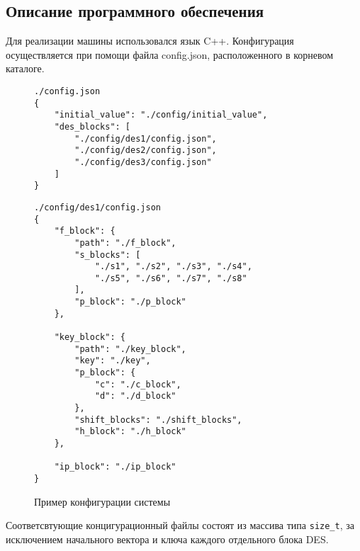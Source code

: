 
\subsection{Описание программного обеспечения}

Для реализации машины использовался язык C++. Конфигурация осуществляется
при помощи файла config.json, расположенного в корневом каталоге.

\begin{figure}[!h]
    \begin{verbatim}
./config.json
{
    "initial_value": "./config/initial_value",
    "des_blocks": [
        "./config/des1/config.json",
        "./config/des2/config.json",
        "./config/des3/config.json"
    ]
}
    \end{verbatim}
\end{figure}

\clearpage

\begin{figure}[!h]
    \begin{verbatim}
./config/des1/config.json
{
    "f_block": {
        "path": "./f_block",
        "s_blocks": [
            "./s1", "./s2", "./s3", "./s4",
            "./s5", "./s6", "./s7", "./s8"
        ],
        "p_block": "./p_block"
    },

    "key_block": {
        "path": "./key_block",
        "key": "./key",
        "p_block": {
            "c": "./c_block",
            "d": "./d_block"
        },
        "shift_blocks": "./shift_blocks",
        "h_block": "./h_block"
    },

    "ip_block": "./ip_block"
}
    \end{verbatim}
    \caption{Пример конфигурации системы}
\end{figure}

Соответсвтующие концигурационный файлы состоят из массива типа \verb|size_t|,
за исключением начального вектора и ключа каждого отдельного блока DES.

\clearpage

